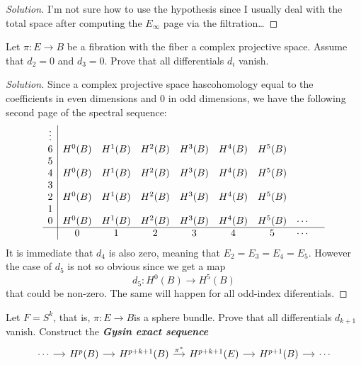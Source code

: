 \begin{proof}[Solution]\leavevmode
	I'm not sure how to use the hypothesis since I usually deal with the total space after computing the $E_\infty$ page via the filtration…
\end{proof}

\begin{manualexercise}{2.6}
	Let $\pi:E\to B$ be a fibration with the fiber a complex projective space. Assume that $d_2=0$ and $d_3=0$. Prove that all differentials $d_i$ vanish.
\end{manualexercise}

\begin{proof}[Solution]\leavevmode
	Since a complex projective space hascohomology equal to the coefficients in even dimensions and 0 in odd dimensions, we have the following second page of the spectral sequence:
	\begin{align*}
\begin{array}{c|cccccccc}
	\vdots &&&&&&&&\\
	6&H^0(B)&H^1(B)&H^{2}(B)&H^{3}(B)&H^{4}(B)&H^{5}(B)&&\\
	5&&&&&&&&\\
	4&H^0(B)&H^1(B)&H^{2}(B)&H^{3}(B)&H^{4}(B)&H^{5}(B)&&\\
	3&&&&&&&&\\
	2&H^0(B)&H^1(B)&H^2(B)&H^{3}(B)&H^{4}(B)&H^{5}(B)&&\\
	1&&&&&&&&\\
	0&H^0(B)&H^1(B)&H^2(B)&H^3(B)&H^4(B)&H^{5}(B)&\cdots &\\
	\hline
	 &0&1&2&3&4&5&\cdots&
\end{array}
\end{align*}
It is immediate that $d_4$ is also zero, meaning that $E_2=E_3=E_4=E_5$. However the case of $d_5$ is not so obvious since we get a map
\[d_5:H^{0}(B)\to H^{5}(B)\]
that could be non-zero. The same will happen for all odd-index diferentials.

\end{proof}

\begin{manualexercise}{2.8}
	Let $F=S^k$, that is, $\pi:E\to B$is a sphere bundle. Prove that all differentials $d_{k+1}$ vanish. Construct the \textit{\textbf{Gysin exact sequence}} 
	\[\begin{tikzcd}[column sep=small]
		\cdots\arrow[r]&H^{p}(B)\arrow[r]&H^{p+k+1}(B)\arrow[r,"\pi^*"]&H^{p+k+1}(E)\arrow[r]&H^{p+1}(B)\arrow[r]&\cdots
	\end{tikzcd}\]
\end{manualexercise}

